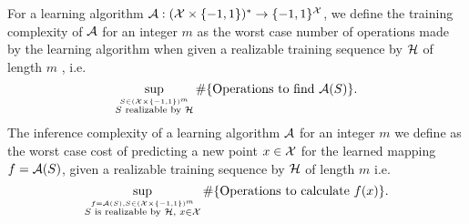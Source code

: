 For a learning algorithm $ \mathcal{A}:(\mathcal{X}\times \{ -1,1 \} )^{*}\rightarrow \{ -1,1 \}^{\mathcal{X}} $, we define the training complexity of $ \mathcal{A} $ for an integer $ m $ as the worst case number of operations made by the learning algorithm when given a realizable training sequence by $ \mathcal{H} $ of length $ m $ , i.e.  $$\sup_{\stackrel{S\in(\mathcal{X}\times \{-1,1\})^{m}}{ S \text{ realizable by } \mathcal{H}  }} \# \{\text{Operations to find } \mathcal{A}(S)\}.$$ The inference complexity of a learning algorithm $ \mathcal{A} $ for an integer $ m $ we define as the worst case cost of predicting a new point $ x\in \mathcal{X} $ for the learned mapping $f= \mathcal{A}(S) $, given a realizable training sequence by $ \mathcal{H} $ of length $ m $   i.e. $$ \sup_{\stackrel{f=\mathcal{A}(S),S\in (\mathcal{X}\times \{-1,1\})^{m}}{ S \text{ is realizable by } \mathcal{H}, \text{ } x\in \mathcal{X}}} \#\{\text{Operations to calculate } f(x)\}.$$